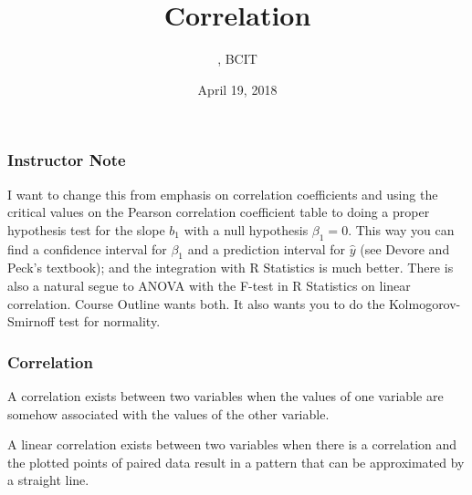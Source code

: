 \documentclass[xcolor=dvipsnames]{beamer}
\title{Correlation}
\subtitle{{\CourseNumber}, BCIT}
\author{\CourseName}
\date{April 19, 2018}
\begin{document}
\begin{frame}
  \titlepage
\end{frame}

\begin{frame}
  \frametitle{Instructor Note}
  I want to change this from emphasis on correlation coefficients and
  using the critical values on the Pearson correlation coefficient
  table to doing a proper hypothesis test for the slope $b_{1}$ with a
  null hypothesis $\beta_{1}=0$. This way you can find a confidence
  interval for $\beta_{1}$ and a prediction interval for $\hat{y}$
  (see Devore and Peck's textbook); and the integration with R
  Statistics is much better. There is also a natural segue to ANOVA
  with the F-test in R Statistics on linear correlation. Course
  Outline wants both. It also wants you to do the Kolmogorov-Smirnoff
  test for normality.
\end{frame}

\begin{frame}
  \frametitle{Correlation}
  A \alert{correlation} exists between two variables when the values of
  one variable are somehow associated with the values of the other
  variable.

  \bigskip

    A \alert{linear correlation} exists between two variables when
    there is a correlation and the plotted points of paired data
    result in a pattern that can be approximated by a straight line.
\end{frame}
\end{document}

